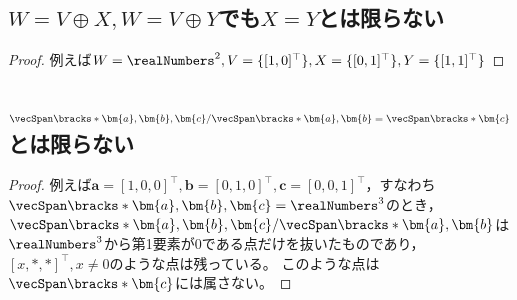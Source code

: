         \subsection{\texorpdfstring{$W=V\oplus X,W=V\oplus Y$}{W=V⊕X, W=V⊕Y}でも\texorpdfstring{$X=Y$}{X=Y}とは限らない}
            \begin{proof}
                例えば$W=\realNumbers^2,V=\{[1,0]^\top\},X=\{[0,1]^\top\},Y=\{[1,1]^\top\}$
            \end{proof}
        \subsection{\texorpdfstring{$\vecSpan\bracks*{\bm{a},\bm{b},\bm{c}}/\vecSpan\bracks*{\bm{a},\bm{b}} = \vecSpan\bracks*{\bm{c}}$}{Span[a,b,c]/Span[a,b]=Span[c]}とは限らない}
            \begin{proof}
                例えば$\bm{a}=[1,0,0]^\top,\bm{b}=[0,1,0]^\top,\bm{c}=[0,0,1]^\top$，すなわち$\vecSpan\bracks*{\bm{a},\bm{b},\bm{c}}=\realNumbers^3$のとき，
                $\vecSpan\bracks*{\bm{a},\bm{b},\bm{c}}/\vecSpan\bracks*{\bm{a},\bm{b}}$は$\realNumbers^3$から第1要素が0である点だけを抜いたものであり，$[x,*,*]^\top,x\neq 0$のような点は残っている。
                このような点は$\vecSpan\bracks*{\bm{c}}$には属さない。
            \end{proof}